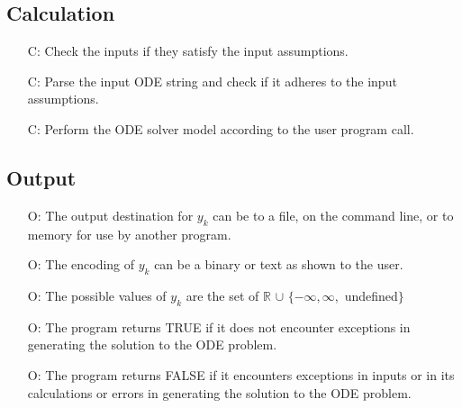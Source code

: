 \documentclass[12pt]{article}
\newcounter{lcnum} %
\newcounter{calcnum} %
\newcounter{outputnum} %
\begin{document}
\subsection{Calculation} \label{sec_Calculation}

\begin{itemize}
\item[C\refstepcounter{calcnum}\thecalcnum \label{C_inputs}:]
Check the inputs if they satisfy the input assumptions.

\item[C\refstepcounter{calcnum}\thecalcnum \label{C_odeparse}:]
Parse the input ODE string and check if it adheres to the input assumptions.

\item[C\refstepcounter{calcnum}\thecalcnum \label{C_progname}:]
Perform the ODE solver model according to the user program call.

\end{itemize}

\subsection{Output} \label{sec_Output}

\begin{itemize}
\item[O\refstepcounter{outputnum}\theoutputnum \label{O_outputyk}:]
The output destination for $y_k$ can be to a file, on the command line, or to memory for use by
another program.

\item[O\refstepcounter{outputnum}\theoutputnum \label{O_encodingyk}:]
The encoding of $y_k$ can be a binary or text as shown to the user.

\item[O\refstepcounter{outputnum}\theoutputnum \label{O_valuesyk}:]
The possible values of $y_k$ are the set of $\mathbb{R}$
$\cup$ $\{-\infty, \infty,$ undefined$\}$

\item[O\refstepcounter{outputnum}\theoutputnum \label{O_success}:]
The program returns TRUE if it does not encounter exceptions in generating the solution
to the ODE problem.

\item[O\refstepcounter{outputnum}\theoutputnum \label{O_fail}:]
The program returns FALSE if it encounters exceptions in inputs or in its calculations
or errors in generating the solution to the ODE problem.

\end{itemize}    
\end{document}
